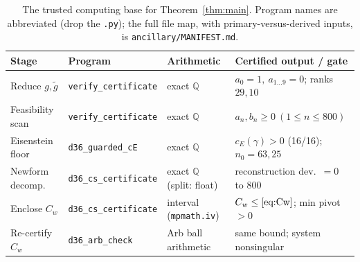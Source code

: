 \documentclass[11pt]{article}
\theoremstyle{remark}
\begin{document}
\begin{table}[htbp]
\centering\small
\begin{tabular}{@{}llll@{}}
\toprule
Stage & Program & Arithmetic & Certified output / gate \\
\midrule
Reduce $g,\tilde g$ & \texttt{verify\_certificate} & exact $\mathbb{Q}$ & $a_0{=}1,\ a_{1\ldots9}{=}0$; ranks $29,10$ \\
Feasibility scan & \texttt{verify\_certificate} & exact $\mathbb{Q}$ & $a_n,b_n\ge0\ (1\le n\le800)$ \\
Eisenstein floor & \texttt{d36\_guarded\_cE} & exact $\mathbb{Q}$ & $c_E(\gamma)>0$ (16/16); $n_0{=}63,25$ \\
Newform decomp. & \texttt{d36\_cs\_certificate} & exact $\mathbb{Q}$ (split: float) & reconstruction dev.\ $=0$ to $800$ \\
Enclose $C_w$ & \texttt{d36\_cs\_certificate} & interval (\texttt{mpmath.iv}) & $C_w\le\eqref{eq:Cw}$; min pivot $>0$ \\
Re-certify $C_w$ & \texttt{d36\_arb\_check} & Arb ball arithmetic & same bound; system nonsingular \\
\bottomrule
\end{tabular}
\caption{The trusted computing base for Theorem~\ref{thm:main}. Program
names are abbreviated (drop the \texttt{.py}); the full file map, with
primary-versus-derived inputs, is \texttt{ancillary/MANIFEST.md}.}
\label{tab:tcb}
\end{table}
\end{document}
